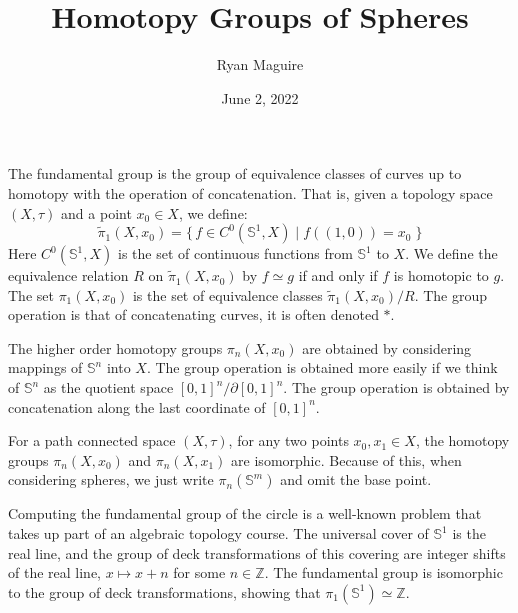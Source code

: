 \documentclass{beamer}
\title{Homotopy Groups of Spheres}
\author{Ryan Maguire}
\date{June 2, 2022}
\begin{document}
    \maketitle
    \begin{frame}
        The fundamental group is the group of equivalence classes of curves up
        to homotopy with the operation of concatenation. That is, given a
        topology space $(X,\tau)$ and a point $x_{0}\in{X}$, we define:
        \begin{equation}
            \tilde{\pi}_{1}(X,x_{0})=
                \{\,f\in{C}^{0}(\mathbb{S}^{1},X)\;|\;
                    f((1,0))=x_{0}\;\}
        \end{equation}
        Here $C^{0}(\mathbb{S}^{1},X)$ is the set of continuous functions from
        $\mathbb{S}^{1}$ to $X$. We define the equivalence relation
        $R$ on $\tilde{\pi}_{1}(X,x_{0})$ by $f\simeq{g}$ if and only if $f$ is
        homotopic to $g$. The set $\pi_{1}(X,x_{0})$ is the set of equivalence
        classes $\tilde{\pi}_{1}(X,x_{0})/R$. The group operation is that of
        concatenating curves, it is often denoted $*$.
    \end{frame}
    \begin{frame}
        The higher order homotopy groups $\pi_{n}(X,x_{0})$ are obtained by
        considering mappings of $\mathbb{S}^{n}$ into $X$. The group operation
        is obtained more easily if we think of $\mathbb{S}^{n}$ as the quotient
        space $[0,1]^{n}/\partial[0,1]^{n}$. The group operation is obtained by
        concatenation along the last coordinate of $[0,1]^{n}$.
        \par\hfill\par
        For a path connected space $(X,\tau)$, for any two points
        $x_{0},x_{1}\in{X}$, the homotopy groups
        $\pi_{n}(X,x_{0})$ and $\pi_{n}(X,x_{1})$ are isomorphic. Because of
        this, when considering spheres, we just write $\pi_{n}(\mathbb{S}^{m})$
        and omit the base point.
    \end{frame}
    \begin{frame}
        Computing the fundamental group of the circle is a well-known problem
        that takes up part of an algebraic topology course. The universal cover
        of $\mathbb{S}^{1}$ is the real line, and the group of deck
        transformations of this covering are integer shifts of the real line,
        $x\mapsto{x}+n$ for some $n\in\mathbb{Z}$. The fundamental group is
        isomorphic to the group of deck transformations, showing that
        $\pi_{1}(\mathbb{S}^{1})\simeq\mathbb{Z}$.
    \end{frame}
\end{document}
